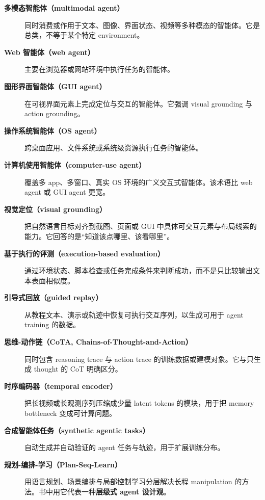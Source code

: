 \begin{description}
\item[\textbf{多模态智能体（multimodal agent）}] 同时消费或作用于文本、图像、界面状态、视频等多种模态的智能体。它是总类，不等于某个特定 environment。

\item[\textbf{Web 智能体（web agent）}] 主要在浏览器或网站环境中执行任务的智能体。

\item[\textbf{图形界面智能体（GUI agent）}] 在可视界面元素上完成定位与交互的智能体。它强调 visual grounding 与 action grounding。

\item[\textbf{操作系统智能体（OS agent）}] 跨桌面应用、文件系统或系统级资源执行任务的智能体。

\item[\textbf{计算机使用智能体（computer-use agent）}] 覆盖多 app、多窗口、真实 OS 环境的广义交互式智能体。该术语比 web agent 或 GUI agent 更宽。

\item[\textbf{视觉定位（visual grounding）}] 把自然语言目标对齐到截图、页面或 GUI 中具体可交互元素与布局线索的能力。它回答的是“知道该点哪里、该看哪里”。

\item[\textbf{基于执行的评测（execution-based evaluation）}] 通过环境状态、脚本检查或任务完成条件来判断成功，而不是只比较输出文本表面相似度。

\item[\textbf{引导式回放（guided replay）}] 从教程文本、演示或轨迹中恢复可执行交互序列，以生成可用于 agent training 的数据。

\item[\textbf{思维-动作链（CoTA, Chains-of-Thought-and-Action）}] 同时包含 reasoning trace 与 action trace 的训练数据或建模对象。它与只生成 thought 的 CoT 明确区分。

\item[\textbf{时序编码器（temporal encoder）}] 把长视频或长观测序列压缩成少量 latent tokens 的模块，用于把 memory bottleneck 变成可计算问题。

\item[\textbf{合成智能体任务（synthetic agentic tasks）}] 自动生成并自动验证的 agent 任务与轨迹，用于扩展训练分布。

\item[\textbf{规划-编排-学习（Plan-Seq-Learn）}] 用语言规划、场景编排与局部控制学习分层解决长程 manipulation 的方法。书中用它代表一种\textbf{层级式 agent 设计观}。
\end{description}

